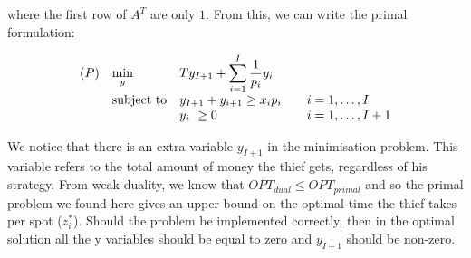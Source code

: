 \documentclass[10pt]{article}
\newenvironment{exercise}[2][Exercise]{\begin{trivlist}
  \item[\hskip \labelsep {\bfseries #1}\hskip \labelsep {\bfseries #2.}]}{\end{trivlist}}
\begin{document}
\begin{exercise}{5.4}
where the first row of $A^T$ are only $1$. From this, we can write the primal formulation:

\begin{equation}
\begin{array}{lll@{}lll}
(P) &\displaystyle\min_{y}\ &&Ty_{I+1} + \displaystyle\sum\limits_{i=1}^{I} \frac{1}{p_i}y_i\\

&\text{subject to} 
&& y_{I+1} + y_{i+1}\geq x_ip_i  &&  i=1 ,\dots, I\\
&&& y_i\ \geq 0 && i=1 ,\dots, I+1\\ 

\end{array}
\end{equation}

We notice that there is an extra variable $y_{I+1}$ in the minimisation problem. This variable refers to the total amount of money the thief gets, regardless of his strategy.
From weak duality, we know that $OPT_{dual}\leq OPT_{primal}$ and so the primal problem we found here gives an upper bound on the optimal time the thief takes per spot ($z_i^*$). Should the problem be implemented correctly, then in the optimal solution all the y variables should be equal to zero and $y_{I+1}$ should be non-zero.\\




\end{exercise}
\end{document}
